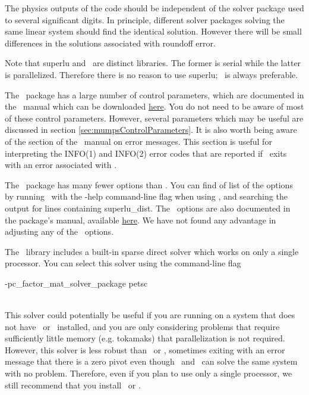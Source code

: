 The physics outputs of the code should be independent of the solver package used to several significant digits.
In principle, different solver packages solving the same linear system should find the identical solution.
However there will be small differences in the solutions associated with roundoff error.

Note that {\ttfamily superlu} and \superludist~are distinct libraries. The former is serial while the latter is parallelized.
Therefore there is no reason to use {\ttfamily superlu}; \superludist~is always preferable.

The \mumps~package has a large number of control parameters, which are documented in the \mumps~manual which can be downloaded \href{http://mumps-solver.org/}{here}.
You do not need to be aware of most of these control parameters.
However, several parameters which may be useful are discussed in section \ref{sec:mumpsControlParameters}.
It is also worth being aware of the section of the \mumps~manual on error messages. 
This section is useful for interpreting the {\ttfamily INFO(1)} and {\ttfamily INFO(2)} error codes that
are reported if \sfincs~exits with an error associated with \mumps. 

The \superludist~package has many fewer options than \mumps. 
You can find of list of the options by running \sfincs~with the {\ttfamily -help} command-line flag when
using \superludist, and searching the output for lines containing {\ttfamily superlu\_dist}.
The \superludist~options are also documented in the package's manual, available \href{http://crd-legacy.lbl.gov/~xiaoye/SuperLU/#superlu_dist}{here}.
We have not found any advantage in adjusting
any of the \superludist~options.

The \PETSc~library includes a built-in sparse direct solver which works on only a single processor.
You can select this solver using the command-line flag \\
\centerline{\ttfamily -pc\_factor\_mat\_solver\_package petsc}\\
This solver could potentially be useful if you are running on a system that does not have \mumps~or \superludist~installed,
and you are only considering problems that require sufficiently little memory (e.g. tokamaks) that parallelization is not required.
However, this solver is less robust than \mumps~or \superludist, sometimes exiting with an error message that there is a zero pivot
even though  \mumps~and \superludist~can solve the same system with no problem. Therefore, even if you plan to use only a single processor,
we still recommend that you install  \mumps~or \superludist.

